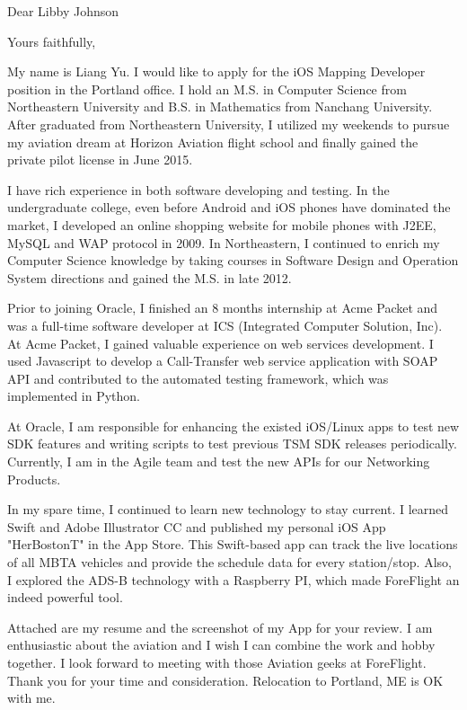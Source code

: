 \documentclass[11pt,a4paper,sans]{moderncv}        %
\begin{document}
\opening{Dear Libby Johnson}
\closing{Yours faithfully,}
\makelettertitle


My name is Liang Yu. I would like to apply for the iOS Mapping Developer position in the Portland office. I hold an M.S. in Computer Science from Northeastern University and B.S. in Mathematics from Nanchang University. After graduated from Northeastern University, I utilized my weekends to pursue my aviation dream at Horizon Aviation flight school and finally gained the private pilot license in June 2015. 

I have rich experience in both software developing and testing. In the undergraduate college, even before Android and iOS phones have dominated the market, I developed an online shopping website for mobile phones with J2EE, MySQL and WAP protocol in 2009. In Northeastern, I continued to enrich my Computer Science knowledge by taking courses in Software Design and Operation System directions and gained the M.S. in late 2012.

Prior to joining Oracle, I finished an 8 months internship at Acme Packet and was a full-time software developer at ICS (Integrated Computer Solution, Inc). At Acme Packet, I gained valuable experience on web services development. I used Javascript to develop a Call-Transfer web service application with SOAP API and contributed to the automated testing framework, which was implemented in Python.

At Oracle, I am responsible for enhancing the existed iOS/Linux apps to test new SDK features and writing scripts to test previous TSM SDK releases periodically. Currently, I am in the Agile team and test the new APIs for our Networking Products. 

In my spare time, I continued to learn new technology to stay current. I learned Swift and Adobe Illustrator CC and published my personal iOS App "HerBostonT" in the App Store. This Swift-based app can track the live locations of all MBTA vehicles and provide the schedule data for every station/stop. Also, I explored the ADS-B technology with a Raspberry PI, which made ForeFlight an indeed powerful tool.

Attached are my resume and the screenshot of my App for your review. I am enthusiastic about the aviation and I wish I can combine the work and hobby together. I look forward to meeting with those Aviation geeks at ForeFlight. Thank you for your time and consideration. Relocation to Portland, ME is OK with me. 


\makeletterclosing
\end{document}
